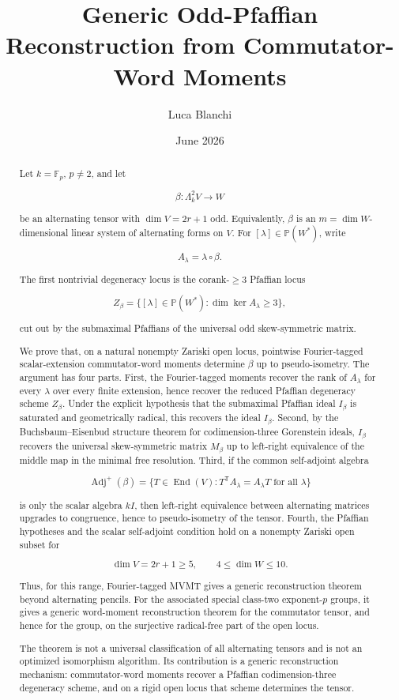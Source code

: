 \documentclass[11pt]{article}
\title{Generic Odd-Pfaffian Reconstruction from Commutator-Word Moments}
\author{Luca Blanchi}
\date{June 2026}
\begin{document}
\maketitle

\begin{abstract}
Let $k=\mathbb F_p$, $p\neq2$, and let

\[
\beta:\Lambda^2_k V\to W
\]

be an alternating tensor with $\dim V=2r+1$ odd. Equivalently, $\beta$ is an $m=\dim W$-dimensional linear system of alternating forms on $V$. For $[\lambda]\in\mathbb P(W^*)$, write

\[
A_\lambda=\lambda\circ\beta.
\]

The first nontrivial degeneracy locus is the corank-$\ge3$ Pfaffian locus

\[
Z_\beta=\{[\lambda]\in\mathbb P(W^*):\dim\ker A_\lambda\ge3\},
\]

cut out by the submaximal Pfaffians of the universal odd skew-symmetric matrix.

We prove that, on a natural nonempty Zariski open locus, pointwise Fourier-tagged scalar-extension commutator-word moments determine $\beta$ up to pseudo-isometry. The argument has four parts. First, the Fourier-tagged moments recover the rank of $A_\lambda$ for every $\lambda$ over every finite extension, hence recover the reduced Pfaffian degeneracy scheme $Z_\beta$. Under the explicit hypothesis that the submaximal Pfaffian ideal $I_\beta$ is saturated and geometrically radical, this recovers the ideal $I_\beta$. Second, by the Buchsbaum--Eisenbud structure theorem for codimension-three Gorenstein ideals, $I_\beta$ recovers the universal skew-symmetric matrix $M_\beta$ up to left-right equivalence of the middle map in the minimal free resolution. Third, if the common self-adjoint algebra

\[
\operatorname{Adj}^{+}(\beta)
=
\{T\in\operatorname{End}(V):T^{\mathsf T}A_\lambda=A_\lambda T\text{ for all }\lambda\}
\]

is only the scalar algebra $kI$, then left-right equivalence between alternating matrices upgrades to congruence, hence to pseudo-isometry of the tensor. Fourth, the Pfaffian hypotheses and the scalar self-adjoint condition hold on a nonempty Zariski open subset for

\[
\dim V=2r+1\ge5,\qquad 4\le \dim W\le10.
\]

Thus, for this range, Fourier-tagged MVMT gives a generic reconstruction theorem beyond alternating pencils. For the associated special class-two exponent-$p$ groups, it gives a generic word-moment reconstruction theorem for the commutator tensor, and hence for the group, on the surjective radical-free part of the open locus.

The theorem is not a universal classification of all alternating tensors and is not an optimized isomorphism algorithm. Its contribution is a generic reconstruction mechanism: commutator-word moments recover a Pfaffian codimension-three degeneracy scheme, and on a rigid open locus that scheme determines the tensor.

\end{abstract}
\end{document}
